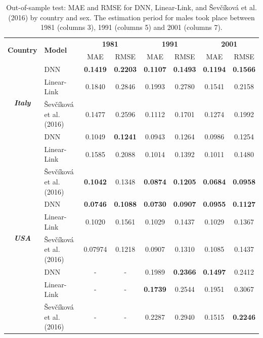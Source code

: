 \documentclass[a4,11pt]{article}
\begin{document}
\begin{table}[H]
		\centering
		\caption{Out-of-sample test: MAE and RMSE for DNN, Linear-Link, and \v{S}ev\v{c}\'{i}kov\'{a} et al. (2016) by country and sex. The estimation period for males took place between 1981 (columns 3), 1991 (columns 5) and 2001 (columns 7).}
		\label{tab:2}
			\footnotesize	
		\begin{tabular}{cl|cc|cc|cc}
			\hline 		
			\multirow{2}{*}{\textbf{Country}} & \multirow{2}{*}{\textbf{Model}} & \multicolumn{2}{c|}{\textbf{1981\textendash 1995}} & \multicolumn{2}{c|}{\textbf{1991\textendash 2005}} & \multicolumn{2}{c}{\textbf{2001\textendash 2015}}\tabularnewline
			\cline{3-8} 
			& & MAE & RMSE & MAE & RMSE & MAE & RMSE\tabularnewline
			\hline 
			\multirow{4}{*}{\textbf{\textit{Italy}}} & \multirow{1}{*}{DNN} &\textbf{0.1419}& \textbf{0.2203}&\textbf{0.1107}& \textbf{0.1493}&\textbf{0.1194}& \textbf{0.1566} \tabularnewline
			& \multirow{1}{*}{Linear-Link} &0.1840 &0.2846& 0.1993& 0.2780&0.1541& 0.2158 \tabularnewline
      & \multirow{1}{*}{\v{S}ev\v{c}\'{i}kov\'{a} et al. (2016)}& 0.1477 &0.2596 &0.1112 &0.1701 &0.1274 &0.1992 \tabularnewline
      \hline 
			\multirow{4}{*}{\textbf{\textit{Japan}}} & \multirow{1}{*}{DNN} &0.1049&\textbf{ 0.1241}& 0.0943&0.1264& 0.0986& 0.1254 \tabularnewline
			& \multirow{1}{*}{Linear-Link} &0.1585 &0.2088& 0.1014& 0.1392&0.1011& 0.1480 \tabularnewline
      & \multirow{1}{*}{\v{S}ev\v{c}\'{i}kov\'{a} et al. (2016)}&\textbf{0.1042} &0.1348& \textbf{0.0874}& \textbf{0.1205}&\textbf{0.0684} & \textbf{0.0958} \tabularnewline
      \hline
			 \multirow{4}{*}{\textbf{\textit{USA}}} &\multirow{1}{*}{DNN} &\textbf{0.0746} &\textbf{0.1088}&\textbf{ 0.0730}&\textbf{0.0907}&\textbf{0.0955}& \textbf{0.1127}\tabularnewline
			& \multirow{1}{*}{Linear-Link} &0.1020 &0.1561& 0.1029& 0.1437&0.1029& 0.1367 \tabularnewline
 	 		&\multirow{1}{*}{\v{S}ev\v{c}\'{i}kov\'{a} et al. (2016)}&0.07974 &0.1218& 0.0907& 0.1310&0.1085& 0.1437 \tabularnewline
	 		\hline 
	 \multirow{4}{*}{\textbf{\textit{Russia (2014)}}} &\multirow{1}{*}{DNN} &-&-&0.1989&\textbf{0.2366}&\textbf{0.1497}& 0.2412\tabularnewline
			& \multirow{1}{*}{Linear-Link} &-&-& \textbf{0.1739}& 0.2544&0.1951& 0.3067 \tabularnewline
 	 		&\multirow{1}{*}{\v{S}ev\v{c}\'{i}kov\'{a} et al. (2016)}&-&-& 0.2287&0.2940&0.1515& \textbf{0.2246} \tabularnewline
 	 		\hline 

		\end{tabular}
	\end{table}
\end{document}
